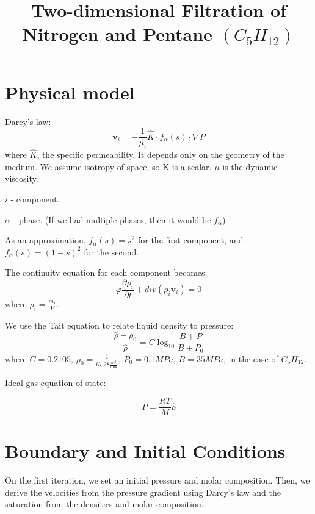 \documentclass[a4paper,12pt]{article}
\author{}
\date{}
\title{Two-dimensional Filtration of Nitrogen and Pentane
\(\left( C_5 H_{12} \right) \)}
\begin{document}
\maketitle

\section{Physical model}

Darcy's law:
\begin{equation}
    \bm{v}_i = -\frac{1}{\mu_i} \hat K \cdot f_\alpha (s)
    \cdot \nabla P
\end{equation}
where \(\hat K\), the specific permeability.
It depends only on the geometry of the medium.
We assume isotropy of space, so K is a scalar.
\(\mu\) is the dynamic viscosity.

\(i\) - component.

\(\alpha\) - phase. (If we had multiple phases, then
it would be \(f_\alpha\))

As an approximation, \(f_\alpha (s) = s^2\) for the first 
component, and \(f_\alpha (s) = (1 - s)^2\) for the second.

The continuity equation for each component becomes:
\begin{equation}
    \varphi \frac{\partial \rho_i}{\partial t}
    + div (\rho_i \bm{v}_i) = 0
\end{equation}
where \(\rho_i = \frac{m_i}{V}\).

We use the Tait equation to relate liquid density to pressure:
\begin{equation}
    \frac{\hat{\rho} - \rho_0}{\hat{\rho}} = C \log_{10}
    \frac{B + P}{B + P_0}
\end{equation}
where \(C = 0.2105\),
\(\rho_0 = \frac{1}{67.28 \frac{m^3}{mol}}\),
\(P_0 = 0.1 MPa\), \(B = 35MPa\),
in the case of \(C_5H_{12}\).

Ideal gas equation of state:

\begin{equation}
    P = \frac{RT}{M} \hat{\rho}
\end{equation}

\section{Boundary and Initial Conditions}

On the first iteration, we set an initial
pressure and molar composition.
Then, we derive the velocities from the 
pressure gradient using Darcy's law and the
saturation from the densities
and molar composition.
\end{document}
